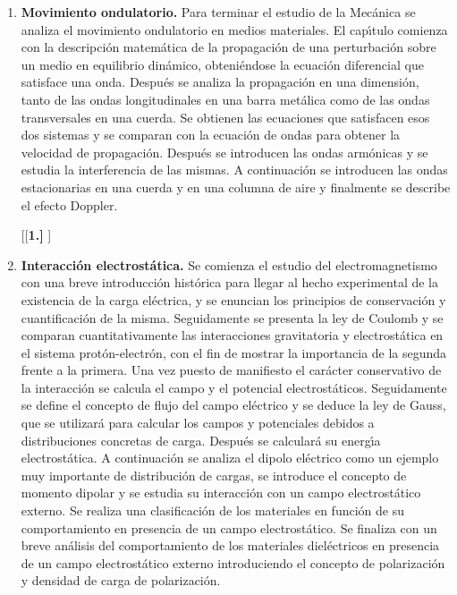 \begin{enumerate} [{\bf 1. }]
\item {\bf  Movimiento ondulatorio.}
Para terminar el estudio de la Mec\'{a}nica se analiza el movimiento ondulatorio
 en medios materiales. El cap\'{\i}tulo comienza con la descripci\'{o}n
 matem\'{a}tica de la propagaci\'{o}n de una perturbaci\'{o}n sobre un medio en
 equilibrio din\'{a}mico, obteni\'{e}ndose la ecuaci\'{o}n diferencial que
 satisface una onda. Despu\'{e}s se analiza la propagaci\'{o}n en una dimensi\'{o}n,
 tanto de las ondas longitudinales en una barra met\'{a}lica como de las ondas
 transversales en una cuerda. Se obtienen las ecuaciones que satisfacen esos dos
 sistemas y se comparan con la ecuaci\'{o}n de ondas para obtener la velocidad 
de propagaci\'{o}n. Despu\'{e}s se introducen las ondas arm\'{o}nicas y se estudia 
la interferencia de las mismas. 
A continuaci\'{o}n se introducen las ondas estacionarias en una cuerda y en una
 columna de aire y finalmente se describe el efecto Doppler.




[{[\bf 1.] }]
\item {\bf Interacci\'{o}n electrost\'{a}tica.} 
Se comienza el estudio del electromagnetismo con una breve introducci\'{o}n
 hist\'{o}rica para llegar al hecho experimental de la existencia de la
 carga el\'{e}ctrica, y se enuncian los principios de conservaci\'{o}n y 
cuantificaci\'{o}n de la misma. Seguidamente se presenta la ley de Coulomb 
y se comparan cuantitativamente las interacciones gravitatoria y 
electrost\'{a}tica en el sistema prot\'{o}n-electr\'{o}n, con el fin de mostrar 
la importancia de la segunda frente a la primera. 
Una vez puesto de manifiesto el car\'{a}cter conservativo de la interacci\'{o}n 
se calcula el campo y el potencial electrost\'{a}ticos. 
Seguidamente se define el concepto de flujo del campo el\'{e}ctrico 
y se deduce la ley de Gauss, que se utilizar\'{a} para calcular los campos
 y potenciales debidos a distribuciones concretas de carga. Despu\'{e}s 
se calcular\'{a} su energ\'{\i}a electrost\'{a}tica. A continuaci\'{o}n se 
analiza el dipolo el\'{e}ctrico como un ejemplo muy importante de 
distribuci\'{o}n de cargas, se introduce el concepto de momento dipolar y se
 estudia su interacci\'{o}n con un campo electrost\'{a}tico externo.
Se realiza una clasificaci\'{o}n de los materiales en funci\'{o}n de su 
comportamiento en presencia de un campo electrost\'{a}tico.
Se finaliza con un breve an\'{a}lisis del comportamiento de los materiales 
diel\'{e}ctricos en presencia de un campo electrost\'{a}tico externo
introduciendo el concepto de polarizaci\'{o}n y densidad de carga de polarizaci\'{o}n. 



\end{enumerate}
